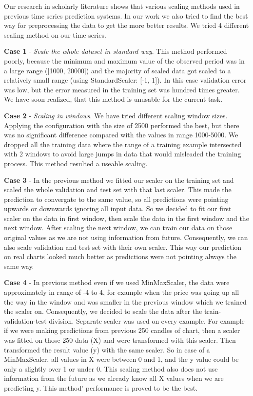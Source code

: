 \documentclass[conference]{IEEEtran}
\begin{document}
Our research in scholarly literature shows that various scaling methods used in previous time series prediction systems. In our work we also tried to find the best way for preprocessing the data to get the more better results. We tried 4 different scaling method on our time series.

\textbf{Case 1} - \emph{Scale the whole dataset in standard way}. This method performed poorly, because the minimum and maximum value of the observed period was in a large range ([1000, 20000]) and the majority of scaled data got scaled to a relatively small range (using StandardScaler: [-1, 1]). In this case validation error was low, but the error measured in the training set was hundred times greater. We have soon realized, that this method is unusable for the current task.

\textbf{Case 2} - \emph{Scaling in windows}. We have tried different scaling window sizes. Applying the configuration with the size of 2500 performed the best, but there was no significant difference compared with the values in range 1000-5000. We dropped all the training data where the range of a training example intersected with 2 windows to avoid large jumps in data that would misleaded the training process. This method resulted a useable scaling.

\textbf{Case 3} - In the previous method we fitted our scaler on the training set and scaled the whole validation and test set with that last scaler. This made the prediction to convergate to the same value, so all predictions were pointing upwards or downwards ignoring all input data. So we decided to fit our first scaler on the data in first window, then scale the data in the first window and the next window. After scaling the next window, we can train our data on those original values as we are not using information from future. Consequently, we can also scale validation and test set with their own scaler. This way our prediction on real charts looked much better as predictions were not pointing always the same way.

\textbf{Case 4} - In previous method even if we used MinMaxScaler, the data were approximately in range of -4 to 4, for example when the price was going up all the way in the window and was smaller in the previous window which we trained the scaler on. Consequently, we decided to scale the data after the train-validation-test division. Separate scaler was used on every example. For example if we were making predictions from previous 250 candles of chart, then a scaler was fitted on those 250 data (X) and were transformed with this scaler. Then transformed the result value (y) with the same scaler. So in case of a MinMaxScaler, all values in X were between 0 and 1, and the y value could be only a slightly over 1 or under 0. This scaling method also does not use information from the future as we already know all X values when we are predicting y. This method' performance is proved to be the best.
\end{document}

